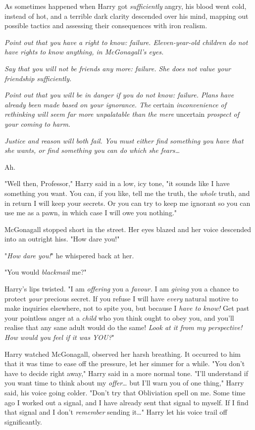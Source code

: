 As sometimes happened when Harry got \emph{sufficiently} angry, his blood went
cold, instead of hot, and a terrible dark clarity descended over his mind,
mapping out possible tactics and assessing their consequences with iron realism.

\emph{Point out that you have a right to know: failure. Eleven-year-old
children do not have rights to know anything, in McGonagall's eyes.}

\emph{Say that you will not be friends any more: failure. She does not value
your friendship sufficiently.}

\emph{Point out that you will be in danger if you do not know: failure. Plans
have already been made based on your ignorance. The} certain
\emph{inconvenience of rethinking will seem far more unpalatable than the mere}
uncertain \emph{prospect of your coming to harm.}

\emph{Justice and reason will both fail. You must either find something you
have that she wants, or find something you can do which she fears{\ldots}}

Ah.

"Well then, Professor," Harry said in a low, icy tone, "it sounds like I have
something you want. You can, if you like, tell me the truth, the \emph{whole}
truth, and in return I will keep your secrets. Or you can try to keep me
ignorant so you can use me as a pawn, in which case I will owe you nothing."

McGonagall stopped short in the street. Her eyes blazed and her voice descended
into an outright hiss. "How dare you!"

"\emph{How dare you!}" he whispered back at her.

"You would \emph{blackmail} me?"

Harry's lips twisted. "I am \emph{offering} you a \emph{favour.} I am
\emph{giving} you a chance to protect \emph{your} precious secret. If you
refuse I will have \emph{every} natural motive to make inquiries elsewhere, not
to spite you, but because I \emph{have to know!} Get past your pointless anger
at a \emph{child} who you think ought to obey you, and you'll realise that any
sane adult would do the same! \emph{Look at it from my perspective! How would
you feel if it was YOU?}"

Harry watched McGonagall, observed her harsh breathing. It occurred to him that
it was time to ease off the pressure, let her simmer for a while. "You don't
have to decide right away," Harry said in a more normal tone. "I'll understand
if you want time to think about my \emph{offer}{\ldots} but I'll warn you of
one thing," Harry said, his voice going colder. "Don't try that Obliviation
spell on me. Some time ago I worked out a signal, and I have already sent that
signal to myself. If I find that signal and I don't \emph{remember} sending
it{\ldots}" Harry let his voice trail off significantly.

